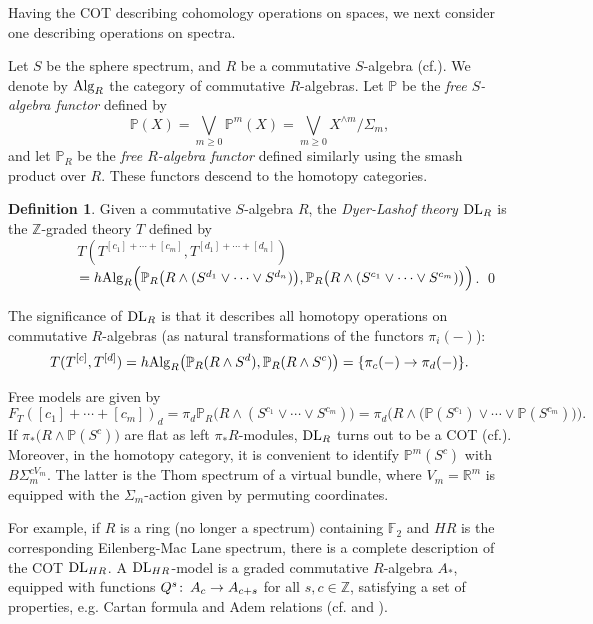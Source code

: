 \documentclass{gtpart}
\theoremstyle{definition}
\newtheorem{defn}[thm]{Definition}
\theoremstyle{remark}
\def\co{\colon\thinspace}
\newcommand{\mb}[1]{\mathbb{#1}}
\newcommand{\DL}{{\rm DL}}
\newcommand{\Alg}{{\rm Alg}}
\newcommand{\cf}[1]{cf.\thinspace{\cite{#1}}}
\newcommand{\cff}[2]{cf.\thinspace{\cite[#1]{#2}}}
\begin{document}
Having the COT describing cohomology operations on spaces, we next consider 
one describing operations on spectra.  

Let $S$ be the sphere spectrum, and $R$ be a commutative $S$-algebra 
(\cf{EKMM}).  We denote by $\Alg_R$ the category of commutative $R$-algebras.  
Let $\mb P$ be the {\em free $S$-algebra functor} defined by 
\[
 {\mb P}(X) = \bigvee_{m \ge 0} {\mb P}^m(X) = \bigvee_{m \ge 0} 
 X^{\wedge m}/\Sigma_m, 
\]
and let ${\mb P}_R$ be the {\em free $R$-algebra functor} defined similarly 
using the smash product over $R$.  These functors descend to the homotopy 
categories.  
\begin{defn}
\label{def:DL}
 Given a commutative $S$-algebra $R$, the {\em Dyer-Lashof theory}  $\DL_R$ is 
 the $\mb Z$-graded theory $T$ defined by 
 \[
  T(T^{[c_1]+\cdots+[c_m]},T^{[d_1]+\cdots+[d_n]}) 
  ~~~~~~~~~~~~~~~~~~~~~~~~~~~~~~~~~~~~~~~~~~~~~~~~~~
 \]
 $~~~~~~~~~~~~~~~= h\Alg_R \Big({\mb P}_R \big(R \wedge (S^{d_1} \vee \cdots 
 \vee S^{d_n}) \big), {\mb P}_R \big(R \wedge (S^{c_1} \vee \cdots \vee 
 S^{c_m}) \big) \Big)$.  \qed
\end{defn}
The significance of $\DL_R$ is that it describes all homotopy operations on 
commutative $R$-algebras (as natural transformations of the functors 
$\pi_i(-)$): 
\[
 T(T^{[c]},T^{[d]}) = h\Alg_R \big( {\mb P}_R(R \wedge S^d), 
 {\mb P}_R(R \wedge S^c) \big) = \{\pi_c(-) \to \pi_d(-)\}.  
\]

Free models are given by 
\[
 F_T([c_1]+\cdots+[c_m])_d = \pi_d {\mb P}_R  \big( R \wedge (S^{c_1} \vee 
 \cdots \vee S^{c_m}) \big) = \pi_d \Big( R \wedge \big({\mb P}(S^{c_1}) \vee 
 \cdots \vee {\mb P}(S^{c_m})\big) \Big).  
\]
If $\pi_*\big(R\wedge{\mb P}(S^c)\big)$ are flat as left $\pi_*R$-modules, 
$\DL_R$ turns out to be a COT (\cff{lemma 7.5}{lpo}).  Moreover, in the 
homotopy category, it is convenient to identify ${\mb P}^m (S^c)$ with 
$B\Sigma_m^{cV_m}$.  The latter is the Thom spectrum of a virtual bundle, 
where $V_m = {\mb R}^m$ is equipped with the $\Sigma_m$-action given by 
permuting coordinates.  

For example, if $R$ is a ring (no longer a spectrum) containing ${\mb F}_2$ 
and $HR$ is the corresponding Eilenberg-Mac Lane spectrum, there is a complete 
description of the COT $\DL_{HR}$.  A $\DL_{HR}$-model is a graded commutative 
$R$-algebra $A_*$, equipped with functions $Q^s\co A_c \to A_{c+s}$ for all 
$s, c \in {\mb Z}$, satisfying a set of properties, e.g. Cartan 
formula and Adem relations (\cff{VIII.3.3}{BMMS} and \cite[section 10]{lpo}).  
\end{document}
